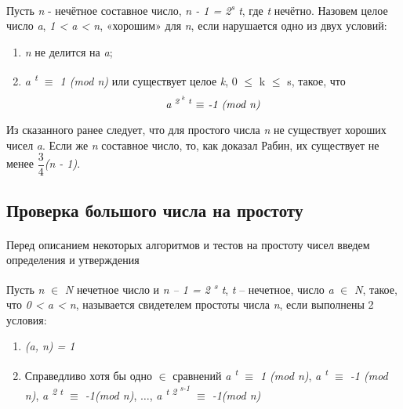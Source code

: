 Пусть \textit{n} - нечётное составное число, \textit{n - 1 = 2\textsuperscript{s} t}, где \textit{t} нечётно. Назовем целое число \textit{a},
\textit{1 < a < n}, «хорошим» для \textit{n}, если нарушается одно из двух условий: 
\begin{enumerate}
 \item \textit{n} не делится на \textit{a};
 \item \textit{a\textsuperscript{ t} {$\equiv$} 1 (mod n)} или существует целое \textit{k}, 0 {$\leq$} k {$\leq$} s, такое, что
  \begin{equation}
      \textit{a\textsuperscript{ 2\textsuperscript{ k} t} {$\equiv$} -1 (mod n)}
  \end{equation}

\end{enumerate}
Из сказанного ранее следует, что для простого числа \textit{n} не существует хороших чисел \textit{a}. Если же \textit{n} составное число, 
то, как доказал Рабин, их существует не менее \textit{{$\dfrac{3}{4}$}(n - 1)}.


\subsection{Проверка большого числа на простоту}

\paragraph{} Перед описанием некоторых алгоритмов и тестов на простоту чисел введем определения и утверждения

  \begin{definition}    
  
      Пусть \textit{n} {$\in$} \textit{N} нечетное число и \textit{n – 1 = 2\textsuperscript{ s} t}, \textit{t} – нечетное,
    число \textit{a} {$\in$} \textit{N}, такое, что \textit{0 < a < n}, называется свидетелем 
    простоты числа \textit{n}, если выполнены 2 условия:

    \begin{enumerate}
      \item \textit{(a, n) = 1}
      \item Справедливо хотя бы одно {$\in$} сравнений \textit{a\textsuperscript{ t} {$\equiv$} 1 (mod n)}, 
  \textit{a\textsuperscript{ t} {$\equiv$} -1 (mod n)}, \textit{a\textsuperscript{ 2 t} {$\equiv$} -1(mod n)},
  {$\dots$}, \textit{a\textsuperscript{ t 2\textsuperscript{ s-1}} {$\equiv$} -1(mod n)}
    \end{enumerate}
  
  \end{definition}

